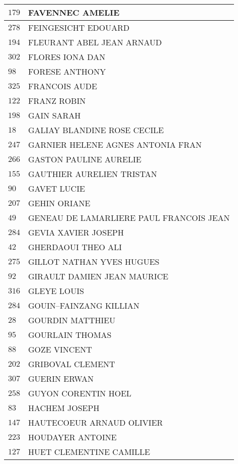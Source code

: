 \begin{xltabular}{\linewidth}{|l|X|}
    $179$ & FAVENNEC AMELIE \\
    \hline
    $278$ & FEINGESICHT EDOUARD \\
    \hline
    $194$ & FLEURANT ABEL JEAN ARNAUD \\
    \hline
    $302$ & FLORES IONA DAN \\
    \hline
    $98$ & FORESE ANTHONY \\
    \hline
    $325$ & FRANCOIS AUDE \\
    \hline
    $122$ & FRANZ ROBIN \\
    \hline
    $198$ & GAIN SARAH \\
    \hline
    $18$ & GALIAY BLANDINE ROSE CECILE \\
    \hline
    $247$ & GARNIER HELENE AGNES ANTONIA FRAN \\
    \hline
    $266$ & GASTON PAULINE AURELIE \\
    \hline
    $155$ & GAUTHIER AURELIEN TRISTAN \\
    \hline
    $90$ & GAVET LUCIE \\
    \hline
    $207$ & GEHIN ORIANE \\
    \hline
    $49$ & GENEAU DE LAMARLIERE PAUL FRANCOIS JEAN \\
    \hline
    $284$ & GEVIA XAVIER JOSEPH \\
    \hline
    $42$ & GHERDAOUI THEO ALI \\
    \hline
    $275$ & GILLOT NATHAN YVES HUGUES \\
    \hline
    $92$ & GIRAULT DAMIEN JEAN MAURICE \\
    \hline
    $316$ & GLEYE LOUIS \\
    \hline
    $284$ & GOUIN--FAINZANG KILLIAN \\
    \hline
    $28$ & GOURDIN MATTHIEU \\
    \hline
    $95$ & GOURLAIN THOMAS \\
    \hline
    $88$ & GOZE VINCENT \\
    \hline
    $202$ & GRIBOVAL CLEMENT \\
    \hline
    $307$ & GUERIN ERWAN \\
    \hline
    $258$ & GUYON CORENTIN HOEL \\
    \hline
    $83$ & HACHEM JOSEPH \\
    \hline
    $147$ & HAUTECOEUR ARNAUD OLIVIER \\
    \hline
    $223$ & HOUDAYER ANTOINE \\
    \hline
    $127$ & HUET CLEMENTINE CAMILLE \\

\end{xltabular}
